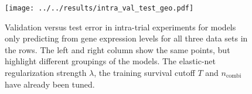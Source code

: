 \begin{figure}
    \centering
    \texttt{[image: ../../results/intra\_val\_test\_geo.pdf]}
    \caption{Validation versus test error in intra-trial experiments for models only predicting 
        from gene expression levels for all 
        three data sets in the rows. The left and right column show the same points, but highlight 
        different groupings of the models. The elastic-net regularization strength $\lambda$, the 
        training survival cutoff $T$ and $n_\text{combi}$ have already been tuned.}
    \label{fig:intra-val-test-geo}
\end{figure}